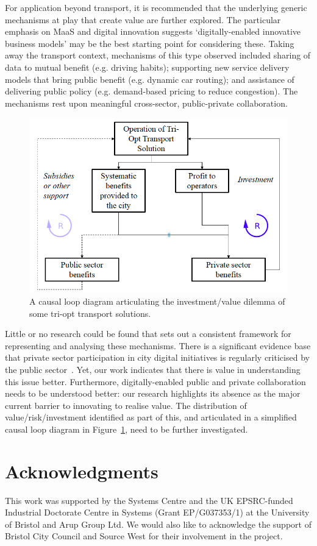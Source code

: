 \documentclass[b5paper,10pt]{article}
\begin{document}
For application beyond transport, it is recommended that the
underlying generic mechanisms at play that create value are further
explored. The particular emphasis on MaaS and digital innovation
suggests `digitally-enabled innovative business models' may be the
best starting point for considering these. Taking away the transport
context, mechanisms of this type observed included sharing of data to
mutual benefit (e.g. driving habits); supporting new service delivery
models that bring public benefit (e.g. dynamic car routing); and
assistance of delivering public policy (e.g. demand-based pricing to
reduce congestion). The mechanisms rest upon meaningful cross-sector,
public-private collaboration.

\begin{figure}[!h]
\centering
\includegraphics[width=0.7\columnwidth]{images/causalloop.png}
\caption{A causal loop diagram articulating the investment/value
  dilemma of some tri-opt transport solutions.}
\label{fig:causalloop}
\end{figure}

Little or no research could be found that sets out a consistent
framework for representing and analysing these mechanisms. There is a
significant evidence base that private sector participation in city
digital initiatives is regularly criticised by the public
sector~\citep{martin:2016}. Yet, our work indicates that there is
value in understanding this issue better. Furthermore,
digitally-enabled public and private collaboration needs to be
understood better: our research highlights its absence as the major
current barrier to innovating to realise value. The distribution of
value/risk/investment identified as part of this, and articulated in a
simplified causal loop diagram in Figure~\ref{fig:causalloop}, need to
be further investigated.

\section*{Acknowledgments}

This work was supported by the Systems Centre and the UK EPSRC-funded
Industrial Doctorate Centre in Systems (Grant EP/G037353/1) at the
University of Bristol and Arup Group Ltd. We would also like to
acknowledge the support of Bristol City Council and Source West for
their involvement in the project.




\end{document}
